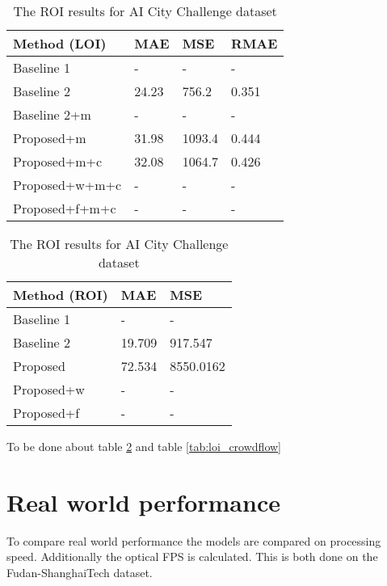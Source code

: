 \begin{table}[!htb]
	\begin{minipage}{.5\linewidth}
      \centering
		\begin{tabular}{llll}
		\hline
		Method (LOI)                               & MAE & MSE & RMAE \\ \hline
		\multicolumn{1}{l|}{Baseline 1}          & - & - & - \\
		\multicolumn{1}{l|}{Baseline 2}          & 24.23 & 756.2 & 0.351 \\
		\multicolumn{1}{l|}{Baseline 2+m}      & - & - & - \\
		\multicolumn{1}{l|}{Proposed+m}        	 & 31.98 & 1093.4 & 0.444 \\
		\multicolumn{1}{l|}{Proposed+m+c}        & 32.08 & 1064.7 & 0.426 \\
		\multicolumn{1}{l|}{Proposed+w+m+c}        & - & - & - \\
		\multicolumn{1}{l|}{Proposed+f+m+c}        & - & - & - \\ \hline
		\end{tabular}
		\caption{\label{tab:loi_crowdflow}The LOI results for AI City Challenge dataset}
	\end{minipage}
	\begin{minipage}{.5\linewidth}
      \centering
		\begin{tabular}{lll}
		\hline
		Method (ROI)                               & MAE & MSE \\ \hline
		\multicolumn{1}{l|}{Baseline 1}          & - & - \\
		\multicolumn{1}{l|}{Baseline 2}          & 19.709 & 917.547 \\
		\multicolumn{1}{l|}{Proposed}        	 & 72.534 & 8550.0162 \\
		\multicolumn{1}{l|}{Proposed+w} 		 & - & - \\
		\multicolumn{1}{l|}{Proposed+f} & - & - \\ \hline
		\end{tabular}
		\caption{\label{tab:roi_crowdflow}The ROI results for AI City Challenge dataset}
	\end{minipage}
\end{table}

To be done about table \ref{tab:roi_crowdflow} and table \ref{tab:loi_crowdflow}


\section{Real world performance}
To compare real world performance the models are compared on processing speed. Additionally the optical FPS is calculated. This is both done on the Fudan-ShanghaiTech dataset.

